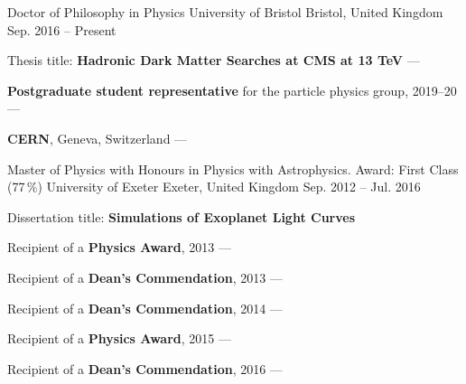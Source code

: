 
\begin{cventries}
    \cventry
        {Doctor of Philosophy in Physics} %
        {University of Bristol} %
        {Bristol, United Kingdom} %
        {Sep. 2016 -- Present} %
        {
        \begin{cvitems} %
            \item {Thesis title: \textbf{Hadronic Dark Matter Searches at CMS at 13 TeV} --- }
            \vspace{0.5mm}
            \item {\textbf{Postgraduate student representative} for the particle physics group, 2019--20 --- } %
            \vspace{0.5mm}
            \item {\textbf{CERN}, Geneva, Switzerland --- }
        \end{cvitems}
        }

    \cventry
        {Master of Physics with Honours in Physics with Astrophysics. Award: First Class (77\,\%)} %
        {University of Exeter} %
        {Exeter, United Kingdom} %
        {Sep. 2012 -- Jul. 2016} %
        {
        \begin{cvitems} %
            \item {Dissertation title: \textbf{Simulations of Exoplanet Light Curves}}
            \vspace{0.5mm}
            \item {Recipient of a \textbf{Physics Award}, 2013 --- }
            \vspace{0.5mm}
            \item {Recipient of a \textbf{Dean's Commendation}, 2013 --- }
            \vspace{0.5mm}
            \item {Recipient of a \textbf{Dean's Commendation}, 2014 --- }
            \vspace{0.5mm}
            \item {Recipient of a \textbf{Physics Award}, 2015 --- }
            \vspace{0.5mm}
            \item {Recipient of a \textbf{Dean's Commendation}, 2016 --- }
        \end{cvitems}
        }


\end{cventries}
